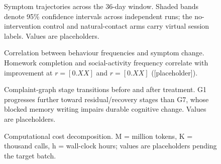\documentclass[10pt]{article}
\begin{document}
\begin{figure}[t]
\centering
{}
\caption{Symptom trajectories across the 36-day window. Shaded bands denote 95\% confidence intervals across independent runs; the no-intervention control and natural-contact arms carry virtual session labels. Values are placeholders.}
\label{fig:traj}
\end{figure}

\begin{figure}[t]
\centering
{}
\caption{Correlation between behaviour frequencies and symptom change. Homework completion and social-activity frequency correlate with improvement at $r = [0.XX]$ and $r = [0.XX]$ ([placeholder]).}
\label{fig:heatmap}
\end{figure}

\begin{figure}[t]
\centering
{}
\caption{Complaint-graph stage transitions before and after treatment. G1 progresses further toward residual/recovery stages than G7, whose blocked memory writing impairs durable cognitive change. Values are placeholders.}
\label{fig:graph}
\end{figure}

\begin{figure}[t]
\centering
{}
\caption{Computational cost decomposition. M = million tokens, K = thousand calls, h = wall-clock hours; values are placeholders pending the target batch.}
\label{fig:cost}
\end{figure}
\end{document}
